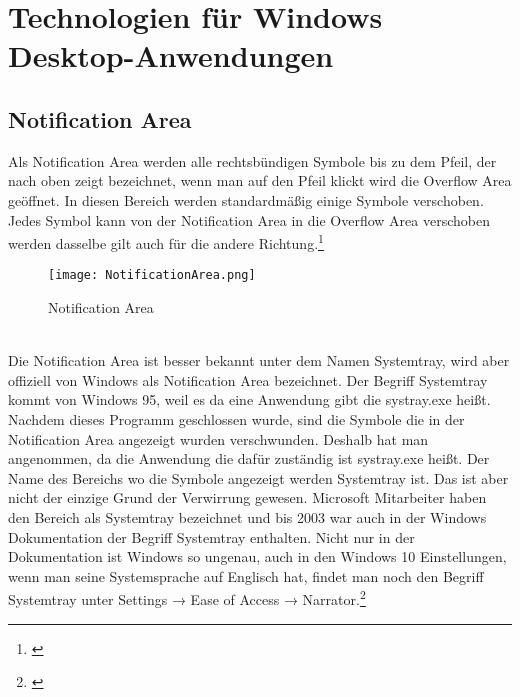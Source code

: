 \chapter{Technologien für Windows Desktop-Anwendungen}
\label{chap:TechnologienfürWindowsDesktop-Anwendungen}

\section{Notification Area}
Als Notification Area werden alle rechtsbündigen Symbole bis zu dem Pfeil, der nach oben zeigt bezeichnet, wenn man auf den Pfeil klickt wird die Overflow Area geöffnet. In diesen Bereich werden standardmäßig einige Symbole verschoben. Jedes Symbol kann von der Notification Area in die Overflow Area verschoben werden dasselbe gilt auch für die andere Richtung.\footnote[1]{\cite[Vgl.][]{10}}
\begin{figure}[H]
    \centering
    \texttt{[image: NotificationArea.png]}
    \caption[NotificationArea]{Notification Area} 
\end{figure}

\newpage
\ \\
Die Notification Area ist besser bekannt unter dem Namen Systemtray, wird aber offiziell von Windows als Notification Area bezeichnet. Der Begriff Systemtray kommt von Windows 95, weil es da eine Anwendung gibt die systray.exe heißt. Nachdem dieses Programm geschlossen wurde, sind die Symbole die in der Notification Area angezeigt wurden verschwunden. Deshalb hat man angenommen, da die Anwendung die dafür zuständig ist systray.exe heißt. Der Name des Bereichs wo die Symbole angezeigt werden Systemtray ist. Das ist aber nicht der einzige Grund der Verwirrung gewesen. Microsoft Mitarbeiter haben den Bereich als Systemtray bezeichnet und bis 2003 war auch in der Windows Dokumentation der Begriff Systemtray enthalten. Nicht nur in der Dokumentation ist Windows so ungenau, auch in den Windows 10 Einstellungen, wenn man seine Systemsprache auf Englisch hat, findet man noch den Begriff Systemtray unter Settings → Ease of Access → Narrator.\footnote[1]{\cite[Vgl.][]{15}}

